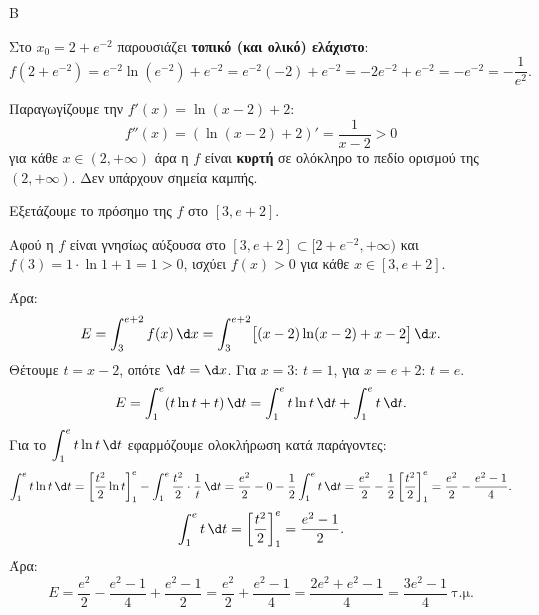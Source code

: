 \begin{thema}{Β}
\begin{erwthma}
Στο $x_0 = 2+e^{-2}$ παρουσιάζει \textbf{τοπικό (και ολικό) ελάχιστο}:
\[
f\!\left(2+e^{-2}\right) = e^{-2}\ln(e^{-2}) + e^{-2} = e^{-2}(-2) + e^{-2} = -2e^{-2} + e^{-2} = -e^{-2} = -\frac{1}{e^2}.
\]

\item Παραγωγίζουμε την $f'(x) = \ln(x-2) + 2$:
\[
f''(x) =\left(\ln(x-2) + 2\right)'= \frac{1}{x-2}>0
\]
για κάθε $x \in (2, +\infty)$ άρα η $f$ είναι \textbf{κυρτή} σε ολόκληρο το πεδίο ορισμού της $(2, +\infty)$. Δεν υπάρχουν σημεία καμπής.

\item Εξετάζουμε το πρόσημο της $f$ στο $[3, e+2]$.

Αφού η $f$ είναι γνησίως αύξουσα στο $[3, e+2] \subset [2+e^{-2}, +\infty)$ και $f(3) = 1\cdot\ln1+1 = 1 > 0$, ισχύει $f(x) > 0$ για κάθε $x \in [3, e+2]$.

Άρα:
\[
E = \int_3^{e+2} f(x)\,\d x = \int_3^{e+2} \bigl[(x-2)\ln(x-2) + x - 2\bigr]\,\d x.
\]
Θέτουμε $t = x - 2$, οπότε $\d t = \d x$. Για $x=3$: $t=1$, για $x=e+2$: $t=e$.
\[
E = \int_1^{e} (t\ln t + t)\,\d t = \int_1^e t\ln t\,\d t + \int_1^e t\,\d t.
\]
Για το $\displaystyle\int_1^e t\ln t\,\d t$ εφαρμόζουμε ολοκλήρωση κατά παράγοντες:
\[
\int_1^e t\ln t\,\d t = \left[\frac{t^2}{2}\ln t\right]_1^e - \int_1^e \frac{t^2}{2}\cdot\frac{1}{t}\,\d t = \frac{e^2}{2} - 0 - \frac{1}{2}\int_1^e t\,\d t = \frac{e^2}{2} - \frac{1}{2}\left[\frac{t^2}{2}\right]_1^e = \frac{e^2}{2} - \frac{e^2-1}{4}.
\]
\[
\int_1^e t\,\d t = \left[\frac{t^2}{2}\right]_1^e = \frac{e^2-1}{2}.
\]
Άρα:
\[
E = \frac{e^2}{2} - \frac{e^2-1}{4} + \frac{e^2-1}{2}
= \frac{e^2}{2} + \frac{e^2-1}{4}
= \frac{2e^2 + e^2 - 1}{4}
= \frac{3e^2-1}{4}\ \text{τ.μ.}
\]

\end{erwthma}
\end{thema}

